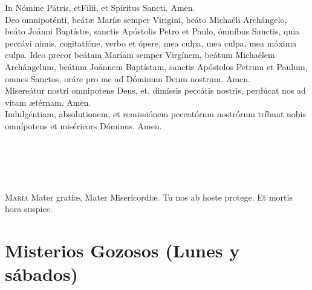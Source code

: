\documentclass[./L00_main.tex]{subfiles}
\newcounter{joyful-counter}
\begin{document}
\begin{minipage}[t]{0.475\textwidth}
      In Nómine Pátris, et{\redcross}Filii, et Spíritus Sancti. Amen.\\

       Deo omnipoténti, beát{\ae} Marí{\ae} semper Virigini, beáto Michaéli Archángelo, beáto Joánni Baptíst{\ae}, 
      sanctis Apóstolis Petro et Paulo, ómníbus Sanctis, quia peccávi nimis, cogitatióne, verbo et ópere, mea culpa, mea culpa, 
      mea máxima culpa. Ideo precor beátam     Maríam semper Virgínem, beátum Michaélem Archángelum, beátum Joánnem Baptístam, 
      sanctis Apóstolos Petrum et Paulum, omnes Sanctos, oráre pro me ad Dóminum Deum nostrum. Amen.\\
      Misereátur nostri omnipotens Deus, et, dimíssis peccátis nostris, perdúcat nos ad vitam {\ae}térnam. Amen.\\
      Indulgéntiam, absolutionem, et remissiónem peccatórum nostrórum tríbuat nobis omnípotens et miséricors Dóminus. Amen.\\

      \\
      \\\\
      \\\\
      \textsc{Maria} Mater grati{\ae}, Mater Misericordi{\ae}. Tu nos ab hoste protege. Et mortis hora suspice.
\end{minipage}

\medskip

\begin{center}
\end{center}

\section*{Misterios Gozosos (Lunes y sábados)}

\end{document}
